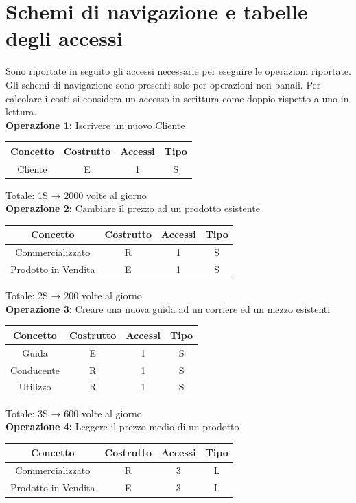 \documentclass[a4paper,12pt]{report}
\begin{document}
\section{Schemi di navigazione e tabelle degli accessi}
Sono riportate in seguito gli accessi necessarie per eseguire le operazioni riportate. 
Gli schemi di navigazione sono presenti solo per operazioni non banali. Per calcolare i costi si considera un accesso in scrittura come doppio rispetto a uno in lettura.\\
\textbf{Operazione 1:}
Iscrivere un nuovo Cliente
\begin{center}
    \begin{tabular}{ | c   c   c   c | } 
    \hline
    Concetto&Costrutto&Accessi&Tipo\\
	\hline
	Cliente&E&1&S\\
	\hline
	\end{tabular}
\end{center}
Totale: 1S → 2000 volte al giorno\\
\textbf{Operazione 2:}
Cambiare il prezzo ad un prodotto esistente
\begin{center}
    \begin{tabular}{ | c   c   c   c | } 
    \hline
    Concetto&Costrutto&Accessi&Tipo\\
	\hline
	Commercializzato&R&1&S\\
	\hline
	Prodotto in Vendita&E&1&S\\
	\hline
	\end{tabular}
\end{center}
Totale: 2S → 200 volte al giorno\\
\textbf{Operazione 3:}
Creare una nuova guida ad un corriere ed un mezzo esistenti
\begin{center}
    \begin{tabular}{ | c   c   c   c | } 	
    \hline
	Concetto&Costrutto&Accessi&Tipo\\
	\hline
	Guida&E&1&S\\
	\hline
	Conducente&R&1&S\\
	\hline
	Utilizzo&R&1&S\\
	\hline
	\end{tabular}
\end{center}
Totale: 3S → 600 volte al giorno\\
\textbf{Operazione 4:}
Leggere il prezzo medio di un prodotto\\
\begin{center}
    \begin{tabular}{ | c   c   c   c | } 
    \hline
	Concetto&Costrutto&Accessi&Tipo\\
	\hline
	Commercializzato&R&3&L\\
	\hline
    Prodotto in Vendita&E&3&L\\
	\hline
	\end{tabular}
\end{center}
\end{document}
